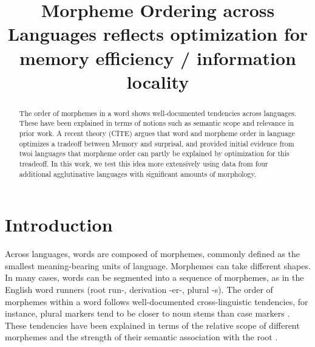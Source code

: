 \documentclass[11pt,letterpaper]{article}
\title{Morpheme Ordering across Languages reflects optimization for memory efficiency / information locality}
\begin{document}
\maketitle

\begin{abstract}
    The order of morphemes in a word shows well-documented tendencies across languages.
    These have been explained in terms of notions such as semantic scope and relevance in prior work.
A recent theory (CITE) argues that word and morpheme order in language optimizes a tradeoff between Memory and surprisal, and provided initial evidence from twoi languages that morpheme order can partly be explained by optimization for this treadeoff.
    In this work, we test this idea more extensively using data from four additional agglutinative languages with significant amounts of morphology.
    
    
\end{abstract}


\section{Introduction}

Across languages, words are composed of morphemes, commonly defined as the smallest meaning-bearing units of language.
Morphemes can take different shapes.
In many cases, words can be segmented into a sequence of morphemes, as in the English word runners (root run-, derivation -er-, plural -s).
The order of morphemes within a word follows well-documented cross-linguistic tendencies, for instance, plural markers tend to be closer to noun stems than case markers \citep[112]{greenberg1963universals}.
These tendencies have been explained in terms of the relative scope of different morphemes  \citep{givon1971historical,venneman1973explanation,baker1985the,rice2000morpheme} and the strength of their semantic association with the root \citep{bybee-morphology-1985}.
\end{document}
